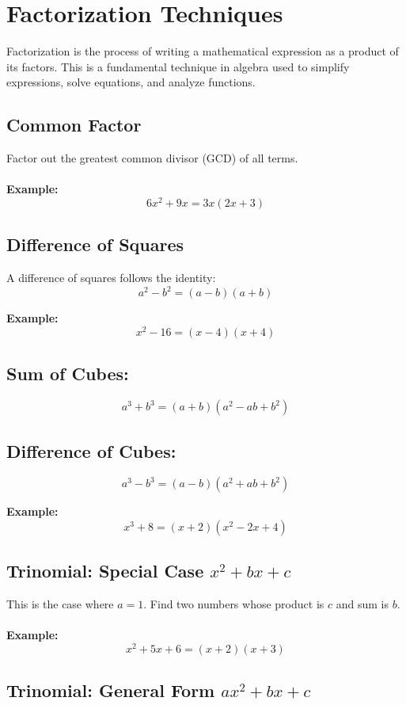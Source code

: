 \section{Factorization Techniques}

Factorization is the process of writing a mathematical expression as a product of its factors. This is a fundamental technique in algebra used to simplify expressions, solve equations, and analyze functions.

\subsection{Common Factor}

Factor out the greatest common divisor (GCD) of all terms.
\\\\
\textbf{Example:}
\[
6x^2 + 9x = 3x(2x + 3)
\]

\subsection{Difference of Squares}

A difference of squares follows the identity:
\[
a^2 - b^2 = (a - b)(a + b)
\]

\textbf{Example:}
\[
x^2 - 16 = (x - 4)(x + 4)
\]


\subsection{Sum of Cubes:}
\[
a^3 + b^3 = (a + b)(a^2 - ab + b^2)
\]

\subsection{Difference of Cubes:}
\[
a^3 - b^3 = (a - b)(a^2 + ab + b^2)
\]

\textbf{Example:}
\[
x^3 + 8 = (x + 2)(x^2 - 2x + 4)
\]


\subsection{Trinomial: Special Case \texorpdfstring{\(x^2 + bx + c\)}{x² + bx + c}}

This is the case where \(a = 1\). Find two numbers whose product is \(c\) and sum is \(b\).
\\\\
\textbf{Example:}
\[
x^2 + 5x + 6 = (x + 2)(x + 3)
\]


\subsection{Trinomial: General Form \texorpdfstring{\(ax^2 + bx + c\)}{ax² + bx + c}}

